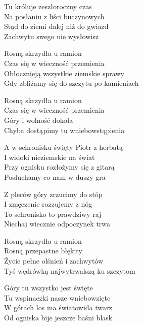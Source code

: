 \begin{text}
    Tu króluje zeszłoroczny czas\\
    Na posłaniu z liści buczynowych\\
    Stąd do ziemi dalej niż do gwiazd\\
    Zachwytu swego nie wysłowisz

    \vin Rosną skrzydła u ramion\\
    \vin Czas się w wieczność przemienia\\
    \vin Obłocznieją wszystkie ziemskie sprawy\\
    \vin Gdy zbliżamy się do szczytu po kamieniach

    \vin Rosną skrzydła u ramion\\
    \vin Czas się w wieczność przemienia\\
    \vin Góry i wolność dokoła\\
    \vin Chyba dostąpimy tu wniebowstąpienia

    A w schronisku święty Piotr z herbatą\\
    I widoki nieziemskie na świat\\
    Przy ognisku rozłożymy się z gitarą\\
    Posłuchamy co nam w duszy gra

    Z pleców góry zrzucimy do stóp\\
    I zmęczenie rozzujemy z nóg\\
    To schronisko to prawdziwy raj\\
    Niechaj wiecznie odpoczynek trwa

    \vin Rosną skrzydła u ramion\\
    \vin Rosną przepastne błękity\\
    \vin Życie pełne olśnień i zachwytów\\
    \vin Tyś wędrówką najwytrwalszą ku szczytom

    \vin Góry tu wszystko jest święte\\
    \vin Tu wspinaczki nasze wniebowzięte\\
    \vin W górach los ma światowida twarz\\
    \vin Od ogniska bije jeszcze baśni blask
\end{text}
